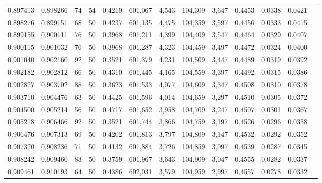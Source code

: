 \begin{tabular}{rrrrrrrrrrrrr}
0.897413 & 0.898266 &    74 &  54 &                                     0.4219 & 601,067 &   4,543 & 104,309 &   3,647 & 0.4453 & 0.0338 & 0.0421 \\
0.898276 & 0.899151 &    68 &  50 &                                     0.4237 & 601,135 &   4,475 & 104,359 &   3,597 & 0.4456 & 0.0333 & 0.0415 \\
0.899155 & 0.900111 &    76 &  50 &                                     0.3968 & 601,211 &   4,399 & 104,409 &   3,547 & 0.4464 & 0.0329 & 0.0407 \\
0.900115 & 0.901032 &    76 &  50 &                                     0.3968 & 601,287 &   4,323 & 104,459 &   3,497 & 0.4472 & 0.0324 & 0.0400 \\
0.901040 & 0.902160 &    92 &  50 &                                     0.3521 & 601,379 &   4,231 & 104,509 &   3,447 & 0.4489 & 0.0319 & 0.0392 \\
0.902182 & 0.902812 &    66 &  50 &                                     0.4310 & 601,445 &   4,165 & 104,559 &   3,397 & 0.4492 & 0.0315 & 0.0386 \\
0.902827 & 0.903702 &    88 &  50 &                                     0.3623 & 601,533 &   4,077 & 104,609 &   3,347 & 0.4508 & 0.0310 & 0.0378 \\
0.903710 & 0.904476 &    63 &  50 &                                     0.4425 & 601,596 &   4,014 & 104,659 &   3,297 & 0.4510 & 0.0305 & 0.0372 \\
0.904500 & 0.905214 &    56 &  50 &                                     0.4717 & 601,652 &   3,958 & 104,709 &   3,247 & 0.4507 & 0.0301 & 0.0367 \\
0.905218 & 0.906466 &    92 &  50 &                                     0.3521 & 601,744 &   3,866 & 104,759 &   3,197 & 0.4526 & 0.0296 & 0.0358 \\
0.906476 & 0.907313 &    69 &  50 &                                     0.4202 & 601,813 &   3,797 & 104,809 &   3,147 & 0.4532 & 0.0292 & 0.0352 \\
0.907320 & 0.908236 &    71 &  50 &                                     0.4132 & 601,884 &   3,726 & 104,859 &   3,097 & 0.4539 & 0.0287 & 0.0345 \\
0.908242 & 0.909460 &    83 &  50 &                                     0.3759 & 601,967 &   3,643 & 104,909 &   3,047 & 0.4555 & 0.0282 & 0.0337 \\
0.909461 & 0.910193 &    64 &  50 &                                     0.4386 & 602,031 &   3,579 & 104,959 &   2,997 & 0.4557 & 0.0278 & 0.0332 \\

\end{tabular}
